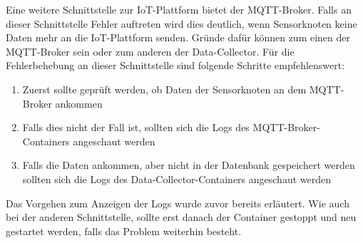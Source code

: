 Eine weitere Schnittstelle zur IoT-Plattform bietet der MQTT-Broker. 
Falls an dieser Schnittstelle Fehler auftreten wird dies deutlich, wenn Sensorknoten keine Daten mehr an die IoT-Plattform senden. Gründe dafür können zum einen der MQTT-Broker sein oder zum anderen der Data-Collector. Für die Fehlerbehebung an dieser Schnittstelle sind folgende Schritte empfehlenswert:
\begin{enumerate}
	\item Zuerst sollte geprüft werden, ob Daten der Sensorknoten an dem MQTT-Broker ankommen
	\item Falls dies nicht der Fall ist, sollten sich die Logs des MQTT-Broker-Containers angeschaut werden
	\item Falls die Daten ankommen, aber nicht in der Datenbank gespeichert werden sollten sich die Logs des Data-Collector-Containers angeschaut werden
\end{enumerate}
Das Vorgehen zum Anzeigen der Logs wurde zuvor bereits erläutert. Wie auch bei der anderen Schnittstelle, sollte erst danach der Container gestoppt und neu gestartet werden, falls das Problem weiterhin besteht. 

